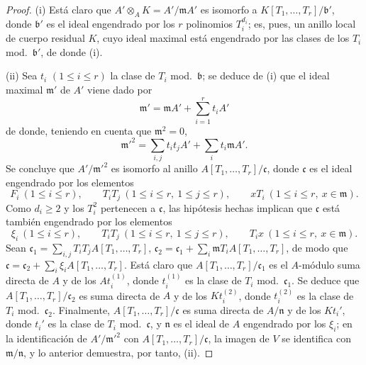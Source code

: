\begin{proof}
(i) Está claro que $A'\otimes_AK=A'/\mathfrak mA'$ es isomorfo a
$K[T_1,\ldots,T_r]/\mathfrak b'$, donde $\mathfrak b'$ es el ideal engendrado
por los $r$ polinomios $T_i^{d_i}$; es, pues, un anillo local de cuerpo
residual $K$, cuyo ideal maximal está engendrado por las clases de los $T_i$
mod.~$\mathfrak b'$, de donde (i).

(ii) Sea $t_i$ $(1\leqslant i\leqslant r)$ la clase de $T_i$
mod.~$\mathfrak b$; se deduce de (i) que el ideal maximal $\mathfrak m'$ de
$A'$ viene dado por
\[
  \mathfrak m'=\mathfrak mA'+\sum_{i=1}^r t_iA'
\]
de donde, teniendo en cuenta que $\mathfrak m^2=0$,
\[
  \mathfrak m'^2=\sum_{i,j}t_it_jA'+\sum_i t_i\mathfrak mA'.
\]
Se concluye que $A'/\mathfrak m'^2$ es isomorfo al anillo
$A[T_1,\ldots,T_r]/\mathfrak c$, donde $\mathfrak c$ es el ideal engendrado por
los elementos
\[
  F_i\ (1\leqslant i\leqslant r),\qquad
  T_iT_j\ (1\leqslant i\leqslant r,\ 1\leqslant j\leqslant r),\qquad
  xT_i\ (1\leqslant i\leqslant r,\ x\in\mathfrak m).
\]
Como $d_i\geqslant2$ y los $T_i^2$ pertenecen a
$\mathfrak c$, las hipótesis hechas implican que $\mathfrak c$ está también
engendrado por los elementos
\[
  \xi_i\ (1\leqslant i\leqslant r),\qquad
  T_iT_j\ (1\leqslant i\leqslant r,\ 1\leqslant j\leqslant r),\qquad
  T_ix\ (1\leqslant i\leqslant r,\ x\in\mathfrak m).
\]
Sean
$\mathfrak c_1=\sum_{i,j}T_iT_jA[T_1,\ldots,T_r]$,
$\mathfrak c_2=\mathfrak c_1+\sum_i\mathfrak mT_iA[T_1,\ldots,T_r]$,
de modo que
$\mathfrak c=\mathfrak c_2+\sum_i\xi_iA[T_1,\ldots,T_r]$. Está claro que
$A[T_1,\ldots,T_r]/\mathfrak c_1$ es el $A$-módulo suma directa de $A$ y
de los $At_i^{(1)}$, donde $t_i^{(1)}$ es la clase de $T_i$
mod.~$\mathfrak c_1$. Se deduce que
$A[T_1,\ldots,T_r]/\mathfrak c_2$ es suma directa de $A$ y de los
$Kt_i^{(2)}$, donde $t_i^{(2)}$ es la clase de $T_i$
mod.~$\mathfrak c_2$. Finalmente, $A[T_1,\ldots,T_r]/\mathfrak c$ es suma
directa de $A/\mathfrak n$ y de los $Kt_i'$, donde $t_i'$ es la clase de $T_i$
mod.~$\mathfrak c$, y $\mathfrak n$ es el ideal de $A$ engendrado por los
$\xi_i$; en la identificación de $A'/\mathfrak m'^2$ con
$A[T_1,\ldots,T_r]/\mathfrak c$, la imagen de $V$ se identifica con
$\mathfrak m/\mathfrak n$, y lo anterior demuestra, por tanto, (ii).
\end{proof}

